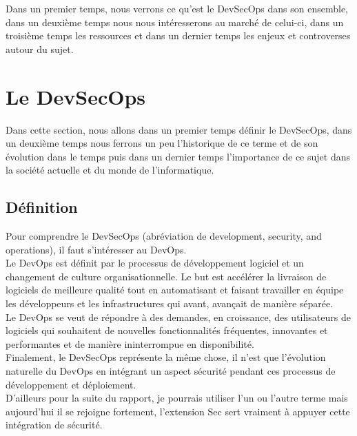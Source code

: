 \documentclass[11pt,a4paper,oneside]{book}
\begin{document}
Dans un premier temps, nous verrons ce qu'est le DevSecOps dans son ensemble, dans un deuxième temps nous nous intéresserons au marché de celui-ci, dans un troisième temps les ressources et dans un dernier temps les enjeux et controverses autour du sujet.

\section{Le DevSecOps}

Dans cette section, nous allons dans un premier temps définir le DevSecOps, dans un deuxième temps nous ferrons un peu l'historique de ce terme et de son évolution dans le temps puis dans un dernier temps l'importance de ce sujet dans la société actuelle et du monde de l'informatique.

\subsection{Définition}

Pour comprendre le DevSecOps (abréviation de development, security, and operations), il faut s'intéresser au DevOps. \\

Le DevOps est définit par le processus de développement logiciel et un changement de culture organisationnelle.
Le but est accélérer la livraison de logiciels de meilleure qualité tout en automatisant et faisant travailler en équipe les développeurs et les infrastructures qui avant, avançait de manière séparée. \\

Le DevOps se veut de répondre à des demandes, en croissance, des utilisateurs de logiciels qui souhaitent de nouvelles fonctionnalités fréquentes, innovantes et performantes et de manière ininterrompue en disponibilité. \\

Finalement, le DevSecOps représente la même chose, il n'est que l'évolution naturelle du DevOps en intégrant un aspect sécurité pendant ces processus de développement et déploiement. \\

D'ailleurs pour la suite du rapport, je pourrais utiliser l'un ou l'autre terme mais aujourd'hui il se rejoigne fortement, l'extension Sec sert vraiment à appuyer cette intégration de sécurité.
\end{document}
